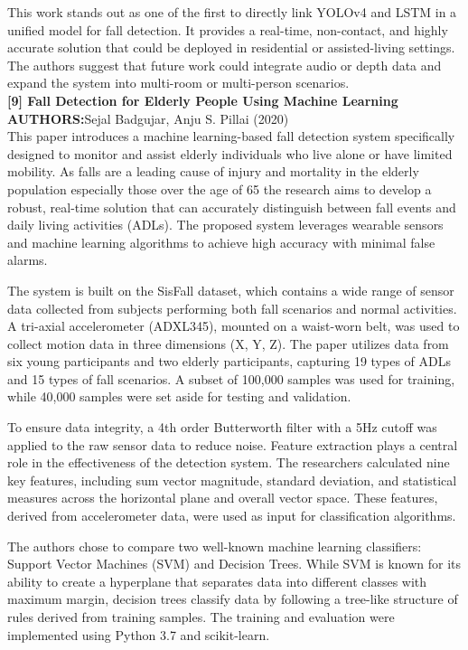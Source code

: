 \documentclass[a4paper, 12pt]{report}
\begin{document}
This work stands out as one of the first to directly link YOLOv4 and LSTM in a unified model for fall detection. It provides a real-time, non-contact, and highly accurate solution that could be deployed in residential or assisted-living settings. The authors suggest that future work could integrate audio or depth data and expand the system into multi-room or multi-person scenarios.\\
\noindent\textbf{[9] Fall Detection for Elderly People Using Machine Learning}\\
\textbf{AUTHORS:}Sejal Badgujar, Anju S. Pillai (2020)\\
This paper introduces a machine learning-based fall detection system specifically designed to monitor and assist elderly individuals who live alone or have limited mobility. As falls are a leading cause of injury and mortality in the elderly population especially those over the age of 65 the research aims to develop a robust, real-time solution that can accurately distinguish between fall events and daily living activities (ADLs). The proposed system leverages wearable sensors and machine learning algorithms to achieve high accuracy with minimal false alarms.

The system is built on the SisFall dataset, which contains a wide range of sensor data collected from subjects performing both fall scenarios and normal activities. A tri-axial accelerometer (ADXL345), mounted on a waist-worn belt, was used to collect motion data in three dimensions (X, Y, Z). The paper utilizes data from six young participants and two elderly participants, capturing 19 types of ADLs and 15 types of fall scenarios. A subset of 100,000 samples was used for training, while 40,000 samples were set aside for testing and validation.

To ensure data integrity, a 4th order Butterworth filter with a 5Hz cutoff was applied to the raw sensor data to reduce noise. Feature extraction plays a central role in the effectiveness of the detection system. The researchers calculated nine key features, including sum vector magnitude, standard deviation, and statistical measures across the horizontal plane and overall vector space. These features, derived from accelerometer data, were used as input for classification algorithms.

The authors chose to compare two well-known machine learning classifiers: Support Vector Machines (SVM) and Decision Trees. While SVM is known for its ability to create a hyperplane that separates data into different classes with maximum margin, decision trees classify data by following a tree-like structure of rules derived from training samples. The training and evaluation were implemented using Python 3.7 and scikit-learn.
\end{document}
